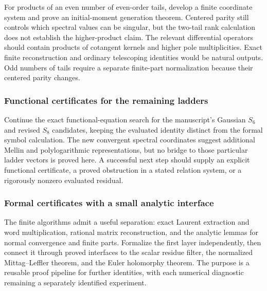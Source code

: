 \documentclass[11pt,a4paper]{article}
\numberwithin{equation}{section}
\theoremstyle{definition}
\theoremstyle{remark}
\begin{document}
For products of an even number of even-order tails, develop a finite
coordinate system and prove an initial-moment generation theorem.
Centered parity still controls which spectral values can be singular,
but the two-tail rank calculation does not establish the higher-product
claim. The relevant differential operators should contain products of
cotangent kernels and higher pole multiplicities. Exact finite
reconstruction and ordinary telescoping identities would be natural
outputs. Odd numbers of tails require a separate finite-part
normalization because their centered parity changes.

\subsubsection{Functional certificates for the remaining ladders}

Continue the exact functional-equation search for the manuscript's
Gaussian $S_6$ and revised $S_8$ candidates, keeping the evaluated
identity distinct from the formal symbol calculation. The new
convergent spectral coordinates suggest additional Mellin and
polylogarithmic representations, but no bridge to those particular
ladder vectors is proved here. A successful next step should supply an
explicit functional certificate, a proved obstruction in a stated
relation system, or a rigorously nonzero evaluated residual.

\subsubsection{Formal certificates with a small analytic interface}

The finite algorithms admit a useful separation: exact Laurent
extraction and word multiplication, rational matrix reconstruction,
and the analytic lemmas for normal convergence and finite parts.
Formalize the first layer independently, then connect it through proved
interfaces to the scalar residue filter, the normalized
Mittag--Leffler theorem, and the Euler holomorphy theorem.
The purpose is a reusable proof pipeline for further identities,
with each numerical diagnostic remaining a separately identified
experiment.

\end{document}
